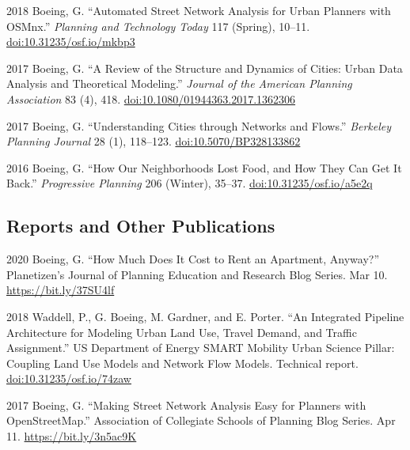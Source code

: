 \documentclass[12pt,letterpaper]{report}
\begin{document}
    \begin{tablist}

        \item[2018] \tab Boeing, G. \enquote{Automated Street Network Analysis for Urban Planners with OSMnx.} \textit{Planning and Technology Today} 117 (Spring), 10--11. \href{https://doi.org/10.31235/osf.io/mkbp3}{doi:10.31235/osf.io/mkbp3}

        \item[2017] \tab Boeing, G. \enquote{A Review of the Structure and Dynamics of Cities: Urban Data Analysis and Theoretical Modeling.} \textit{Journal of the American Planning Association} 83 (4), 418. \href{https://doi.org/10.1080/01944363.2017.1362306}{doi:10.1080/01944363.2017.1362306}

        \item[2017] \tab Boeing, G. \enquote{Understanding Cities through Networks and Flows.} \textit{Berkeley Planning Journal} 28 (1), 118--123. \href{https://doi.org/10.5070/BP328133862}{doi:10.5070/BP328133862}

        \item[2016] \tab Boeing, G. \enquote{How Our Neighborhoods Lost Food, and How They Can Get It Back.} \textit{Progressive Planning} 206 (Winter), 35--37. \href{https://doi.org/10.31235/osf.io/a5e2q}{doi:10.31235/osf.io/a5e2q}

    \end{tablist}



    \subsection*{Reports and Other Publications}

    \begin{tablist}

        \item[2020] \tab Boeing, G. \enquote{How Much Does It Cost to Rent an Apartment, Anyway?} Planetizen's Journal of Planning Education and Research Blog Series. Mar 10. \href{https://bit.ly/37SU4lf}{https://bit.ly/37SU4lf}

        \item[2018] \tab Waddell, P., G. Boeing, M. Gardner, and E. Porter. \enquote{An Integrated Pipeline Architecture for Modeling Urban Land Use, Travel Demand, and Traffic Assignment.} US Department of Energy SMART Mobility Urban Science Pillar: Coupling Land Use Models and Network Flow Models. Technical report. \href{https://doi.org/10.31235/osf.io/74zaw}{doi:10.31235/osf.io/74zaw}

        \item[2017] \tab Boeing, G. \enquote{Making Street Network Analysis Easy for Planners with OpenStreetMap.} Association of Collegiate Schools of Planning Blog Series. Apr 11. \href{https://bit.ly/3n5ac9K}{https://bit.ly/3n5ac9K}

    \end{tablist}
\end{document}
